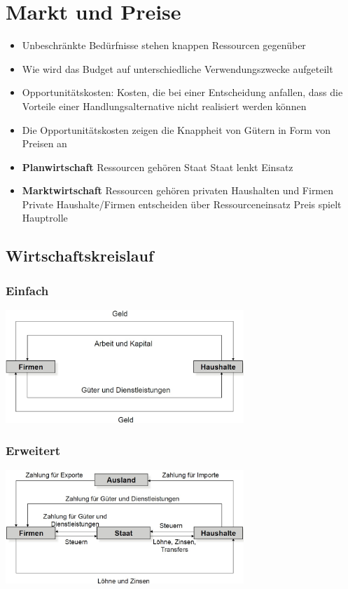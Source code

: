 \section{Markt und Preise}
\begin{itemize}
	\item Unbeschränkte Bedürfnisse stehen knappen Ressourcen gegenüber
	\item Wie wird das Budget auf unterschiedliche Verwendungszwecke aufgeteilt
	\item Opportunitätskosten: Kosten, die bei einer Entscheidung anfallen, dass die Vorteile einer Handlungsalternative nicht realisiert werden können
	\item Die Opportunitätskosten zeigen die Knappheit von Gütern in Form von Preisen an
	\item \textbf{Planwirtschaft}
	\subitem Ressourcen gehören Staat
	\subitem Staat lenkt Einsatz
	\item \textbf{Marktwirtschaft}
	\subitem Ressourcen gehören privaten Haushalten und Firmen 
	\subitem Private Haushalte/Firmen entscheiden über Ressourceneinsatz
	\subitem Preis spielt Hauptrolle
\end{itemize}
\subsection{Wirtschaftskreislauf}
\begin{multicols}{2}
	\subsubsection{Einfach}
	\includegraphics[width=9cm]{images/einfachWS.jpg}
	\subsubsection{Erweitert}
	\includegraphics[width=9cm]{images/erweiterWS.jpg}
\end{multicols}
